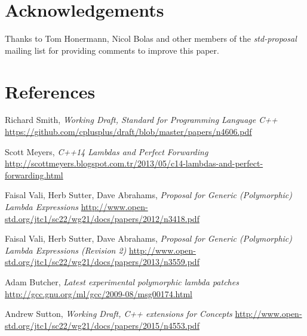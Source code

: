 \documentclass[11pt]{article}
\begin{document}
\section{Acknowledgements}
Thanks to Tom Honermann, Nicol Bolas and other members of the \textit{std-proposal}
mailing list for providing comments to improve this paper.


\section{References}
\renewcommand{\section}[2]{}%
\begin{thebibliography}{9}

    Richard Smith,
    \emph{Working Draft, Standard for Programming Language C++}\newline
    \url{https://github.com/cplusplus/draft/blob/master/papers/n4606.pdf}

    Scott Meyers,
    \emph{C++14 Lambdas and Perfect Forwarding}\newline
    \url{http://scottmeyers.blogspot.com.tr/2013/05/c14-lambdas-and-perfect-forwarding.html}

    Faisal Vali, Herb Sutter, Dave Abrahams,
    \emph{Proposal for Generic (Polymorphic) Lambda Expressions}\newline
    \url{http://www.open-std.org/jtc1/sc22/wg21/docs/papers/2012/n3418.pdf}

    Faisal Vali, Herb Sutter, Dave Abrahams,
    \emph{Proposal for Generic (Polymorphic) Lambda Expressions (Revision 2)}\newline
    \url{http://www.open-std.org/jtc1/sc22/wg21/docs/papers/2013/n3559.pdf}

    Adam Butcher,
    \emph{Latest experimental polymorphic lambda patches}\newline
    \url{http://gcc.gnu.org/ml/gcc/2009-08/msg00174.html}

    Andrew Sutton,
    \emph{Working Draft, C++ extensions for Concepts}\newline
    \url{http://www.open-std.org/jtc1/sc22/wg21/docs/papers/2015/n4553.pdf}

\end{thebibliography}
\end{document}

